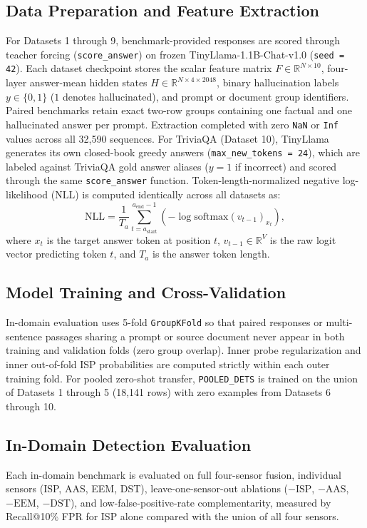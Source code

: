 \documentclass{ieeeaccess}
\begin{document}
\subsection{Data Preparation and Feature Extraction}
For Datasets 1 through 9, benchmark-provided responses are scored through teacher forcing (\texttt{score\_answer}) on frozen TinyLlama-1.1B-Chat-v1.0 (\texttt{seed = 42}). Each dataset checkpoint stores the scalar feature matrix $F \in \mathbb{R}^{N \times 10}$, four-layer answer-mean hidden states $H \in \mathbb{R}^{N \times 4 \times 2048}$, binary hallucination labels $y \in \{0, 1\}$ ($1$ denotes hallucinated), and prompt or document group identifiers. Paired benchmarks retain exact two-row groups containing one factual and one hallucinated answer per prompt. Extraction completed with zero \texttt{NaN} or \texttt{Inf} values across all 32,590 sequences. For TriviaQA (Dataset 10), TinyLlama generates its own closed-book greedy answers (\texttt{max\_new\_tokens = 24}), which are labeled against TriviaQA gold answer aliases ($y = 1$ if incorrect) and scored through the same \texttt{score\_answer} function. Token-length-normalized negative log-likelihood (NLL) is computed identically across all datasets as:
\begin{equation}
\text{NLL} = \frac{1}{T_a} \sum_{t = a_{\text{start}}}^{a_{\text{end}} - 1} \left(-\log \text{softmax}(v_{t-1})_{x_t}\right),
\label{eq:nll}
\end{equation}
where $x_t$ is the target answer token at position $t$, $v_{t-1} \in \mathbb{R}^{V}$ is the raw logit vector predicting token $t$, and $T_a$ is the answer token length.

\subsection{Model Training and Cross-Validation}
In-domain evaluation uses 5-fold \texttt{GroupKFold} so that paired responses or multi-sentence passages sharing a prompt or source document never appear in both training and validation folds (zero group overlap). Inner probe regularization and inner out-of-fold ISP probabilities are computed strictly within each outer training fold. For pooled zero-shot transfer, \texttt{POOLED\_DETS} is trained on the union of Datasets 1 through 5 (18,141 rows) with zero examples from Datasets 6 through 10.

\subsection{In-Domain Detection Evaluation}
Each in-domain benchmark is evaluated on full four-sensor fusion, individual sensors (ISP, AAS, EEM, DST), leave-one-sensor-out ablations ($-\text{ISP}$, $-\text{AAS}$, $-\text{EEM}$, $-\text{DST}$), and low-false-positive-rate complementarity, measured by Recall@10\% FPR for ISP alone compared with the union of all four sensors.
\end{document}
